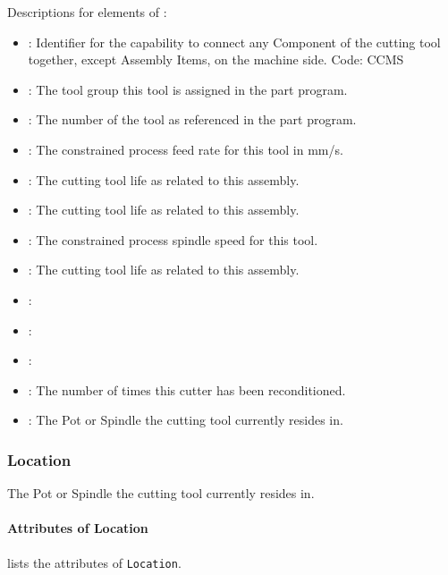 Descriptions for elements of :

\begin{itemize}
\item {} : Identifier for the capability to connect any Component of the cutting tool together, except Assembly Items, on the machine side. Code: CCMS
\item {} : The tool group this tool is assigned in the part program.
\item {} : The number of the tool as referenced in the part program.
\item {} : The constrained process feed rate for this tool in mm/s.
\item {} : The cutting tool life as related to this assembly.
\item {} : The cutting tool life as related to this assembly.
\item {} : The constrained process spindle speed for this tool.

\item {} : The cutting tool life as related to this assembly.
\item {} : 
\item {} : 
\item {} : 
\item {} : The number of times this cutter has been reconditioned.

\item {} : The Pot or Spindle the cutting tool currently resides in.
\end{itemize}
\FloatBarrier

\subsubsection{Location}
\label{sec:Location}



The Pot or Spindle the cutting tool currently resides in.


\paragraph{Attributes of Location}\mbox{}
\label{sec:Attributes of Location}

 lists the attributes of \texttt{Location}.

